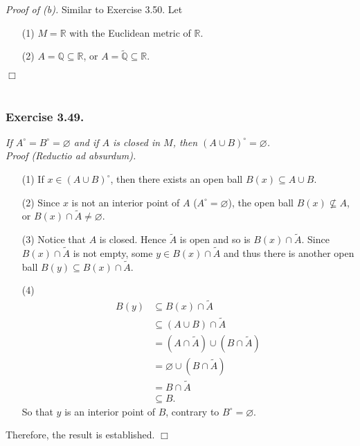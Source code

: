 \documentclass{article}
\begin{document}
\emph{Proof of (b).}
Similar to Exercise 3.50. Let
\begin{enumerate}
\item[(1)]
$M = \mathbb{R}$ with the Euclidean metric of $\mathbb{R}$.
\item[(2)]
$A = \mathbb{Q} \subseteq \mathbb{R}$,
or $A = \widetilde{\mathbb{Q}} \subseteq \mathbb{R}$.
\end{enumerate}
$\Box$ \\\\






\subsubsection*{Exercise 3.49.}
\emph{If $A^{\circ} = B^{\circ} = \varnothing$ and if $A$ is closed in $M$,
then $(A \cup B)^{\circ} = \varnothing$. } \\

\emph{Proof (Reductio ad absurdum).}
\begin{enumerate}
\item[(1)]
If $x \in (A \cup B)^{\circ}$, then there exists an open ball $B(x) \subseteq A \cup B$.
\item[(2)]
Since $x$ is not an interior point of $A$ ($A^{\circ} = \varnothing$),
the open ball $B(x) \not\subseteq A$, or $B(x) \cap \widetilde{A} \neq \varnothing$.
\item[(3)]
Notice that $A$ is closed.
Hence $\widetilde{A}$ is open and so is $B(x) \cap \widetilde{A}$.
Since $B(x) \cap \widetilde{A}$ is not empty,
some $y \in B(x) \cap \widetilde{A}$ and thus
there is another open ball $B(y) \subseteq B(x) \cap \widetilde{A}$.
\item[(4)]
\begin{align*}
B(y)
&\subseteq B(x) \cap \widetilde{A} \\
&\subseteq (A \cup B) \cap \widetilde{A} \\
&= (A \cap \widetilde{A}) \cup (B \cap \widetilde{A}) \\
&= \varnothing \cup (B \cap \widetilde{A}) \\
&= B \cap \widetilde{A} \\
&\subseteq B.
\end{align*}
So that $y$ is an interior point of $B$, contrary to $B^{\circ} = \varnothing$.
\end{enumerate}
Therefore, the result is established.
$\Box$ \\\\
\end{document}
